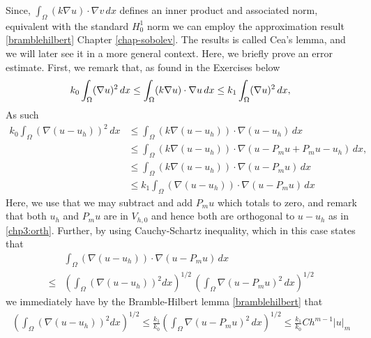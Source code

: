 Since, $\int_\Omega (k \nabla u) \cdot \nabla v \, dx$ defines an inner product and associated norm, equivalent with 
the standard $H^1_0$ norm we can employ the approximation result \eqref{bramblehilbert} Chapter \ref{chap-sobolev}. 
The results is called Cea's lemma, and we will later see it in a more general context. 
Here, we briefly prove an error estimate. First, we remark that, as found in the Exercises below  
\[
k_0 \int_\Omega (\nabla u)^2  \, dx \le   \int_\Omega (k \nabla u) \cdot \nabla u \, dx \le   
k_1 \int_\Omega (\nabla u)^2  \, dx,  \\  
\]
As such 
\begin{align*}
	k_0 \int_\Omega (\nabla (u-u_h))^2  \, dx &\le   \int_\Omega (k \nabla (u -u_h)) \cdot \nabla (u-u_h) \, dx \\    
&\le   \int_\Omega (k \nabla (u -u_h)) \cdot \nabla (u-P_m u + P_m u - u_h) \, dx, \\ 
&\le   \int_\Omega (k \nabla (u -u_h)) \cdot \nabla (u-P_m u ) \, dx \\ 
&\le   k_1 \int_\Omega (\nabla (u -u_h)) \cdot \nabla (u-P_m u ) \, dx 
\end{align*}
Here, we use that we may subtract and add $P_m u$ which totals to zero, and remark that both $u_h$ and $P_m u$ 
are in $V_{h,0}$ and hence both are orthogonal to $u - u_h$ as in \eqref{chp3:orth}. 
Further, by using Cauchy-Schartz inequality, which in this case states that   
\begin{align*}
&  \int_\Omega ( \nabla (u -u_h)) \cdot \nabla (u-P_m u ) \, dx \\ \le  
&  
(\int_\Omega ( \nabla (u -u_h))^{2} dx )^{1/2} \,  (\int_\Omega \nabla (u-P_m u )^2 \, dx)^{1/2} 
\end{align*}
we immediately have by the Bramble-Hilbert lemma \eqref{bramblehilbert} that 
\begin{align}
(\int_\Omega ( \nabla (u -u_h))^{2} dx )^{1/2} \le \frac{k_1}{k_0}   (\int_\Omega \nabla (u-P_m u )^2 \, dx)^{1/2} 
 \le \frac{k_1}{k_0}  C h^{m-1} |u|_{m} 
\end{align}

